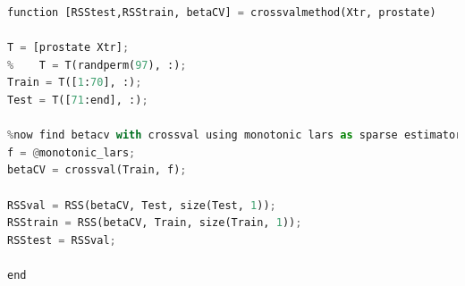 \documentclass{article}
\begin{document}
\begin{lstlisting}[language=python]
function [RSStest,RSStrain, betaCV] = crossvalmethod(Xtr, prostate)

T = [prostate Xtr];
%    T = T(randperm(97), :);
Train = T([1:70], :);
Test = T([71:end], :);

%now find betacv with crossval using monotonic lars as sparse estimator
f = @monotonic_lars;
betaCV = crossval(Train, f);

RSSval = RSS(betaCV, Test, size(Test, 1));
RSStrain = RSS(betaCV, Train, size(Train, 1));
RSStest = RSSval;

end
	
\end{lstlisting}
	
\end{document}
